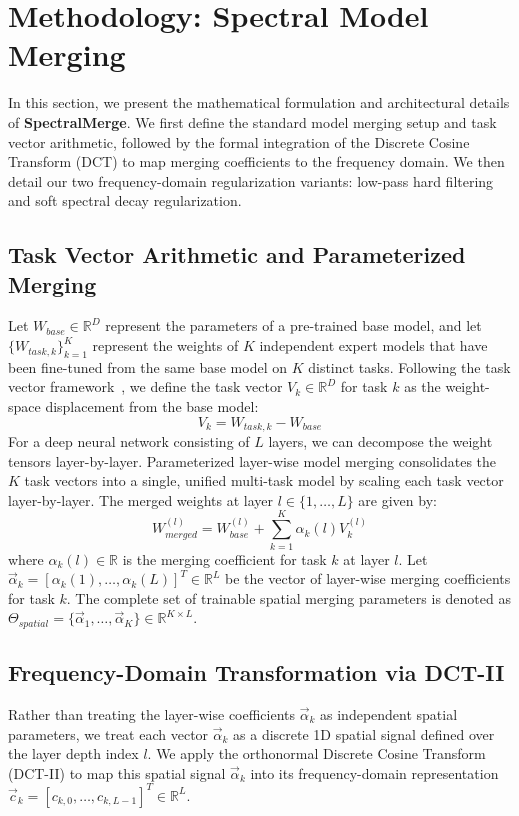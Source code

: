 \section{Methodology: Spectral Model Merging}
\label{sec:method}

In this section, we present the mathematical formulation and architectural details of \textbf{SpectralMerge}. We first define the standard model merging setup and task vector arithmetic, followed by the formal integration of the Discrete Cosine Transform (DCT) to map merging coefficients to the frequency domain. We then detail our two frequency-domain regularization variants: low-pass hard filtering and soft spectral decay regularization.

\subsection{Task Vector Arithmetic and Parameterized Merging}
Let $W_{base} \in \mathbb{R}^D$ represent the parameters of a pre-trained base model, and let $\{W_{task, k}\}_{k=1}^K$ represent the weights of $K$ independent expert models that have been fine-tuned from the same base model on $K$ distinct tasks. Following the task vector framework~\cite{ilharco2022editing}, we define the task vector $V_k \in \mathbb{R}^D$ for task $k$ as the weight-space displacement from the base model:
\begin{equation}
    V_k = W_{task, k} - W_{base}
\end{equation}
For a deep neural network consisting of $L$ layers, we can decompose the weight tensors layer-by-layer. Parameterized layer-wise model merging consolidates the $K$ task vectors into a single, unified multi-task model by scaling each task vector layer-by-layer. The merged weights at layer $l \in \{1, \dots, L\}$ are given by:
\begin{equation}
    W_{merged}^{(l)} = W_{base}^{(l)} + \sum_{k=1}^K \alpha_k(l) V_k^{(l)}
\end{equation}
where $\alpha_k(l) \in \mathbb{R}$ is the merging coefficient for task $k$ at layer $l$. Let $\vec{\alpha}_k = [\alpha_k(1), \dots, \alpha_k(L)]^T \in \mathbb{R}^L$ be the vector of layer-wise merging coefficients for task $k$. The complete set of trainable spatial merging parameters is denoted as $\Theta_{spatial} = \{\vec{\alpha}_1, \dots, \vec{\alpha}_K\} \in \mathbb{R}^{K \times L}$.

\subsection{Frequency-Domain Transformation via DCT-II}
Rather than treating the layer-wise coefficients $\vec{\alpha}_k$ as independent spatial parameters, we treat each vector $\vec{\alpha}_k$ as a discrete 1D spatial signal defined over the layer depth index $l$. We apply the orthonormal Discrete Cosine Transform (DCT-II) to map this spatial signal $\vec{\alpha}_k$ into its frequency-domain representation $\vec{c}_k = [c_{k,0}, \dots, c_{k,L-1}]^T \in \mathbb{R}^L$.

